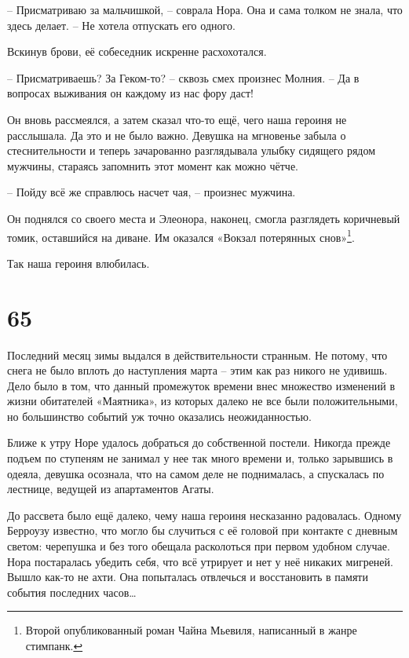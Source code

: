 \documentclass[
  a5paperpaper,
  DIV=11,
  numbers=noendperiod]{scrreprt}
\begin{document}
-- Присматриваю за мальчишкой, -- соврала Нора. Она и сама толком не
знала, что здесь делает. -- Не хотела отпускать его одного.

Вскинув брови, её собеседник искренне расхохотался.

-- Присматриваешь? За Геком-то? -- сквозь смех произнес Молния. -- Да в
вопросах выживания он каждому из нас фору даст!

Он вновь рассмеялся, а затем сказал что-то ещё, чего наша героиня не
расслышала. Да это и не было важно. Девушка на мгновенье забыла о
стеснительности и теперь зачарованно разглядывала улыбку сидящего рядом
мужчины, стараясь запомнить этот момент как можно чётче.

-- Пойду всё же справлюсь насчет чая, -- произнес мужчина.

Он поднялся со своего места и Элеонора, наконец, смогла разглядеть
коричневый томик, оставшийся на диване. Им оказался «Вокзал потерянных
снов»\footnote{Второй опубликованный роман Чайна Мьевиля, написанный в
  жанре стимпанк.}.

Так наша героиня влюбилась.

\section*{65}\label{65}


Последний месяц зимы выдался в действительности странным. Не потому, что
снега не было вплоть до наступления марта -- этим как раз никого не
удивишь. Дело было в том, что данный промежуток времени внес множество
изменений в жизни обитателей «Маятника», из которых далеко не все были
положительными, но большинство событий уж точно оказались
неожиданностью.

Ближе к утру Норе удалось добраться до собственной постели. Никогда
прежде подъем по ступеням не занимал у нее так много времени и, только
зарывшись в одеяла, девушка осознала, что на самом деле не поднималась,
а спускалась по лестнице, ведущей из апартаментов Агаты.

До рассвета было ещё далеко, чему наша героиня несказанно радовалась.
Одному Берроузу известно, что могло бы случиться с её головой при
контакте с дневным светом: черепушка и без того обещала расколоться при
первом удобном случае. Нора постаралась убедить себя, что всё утрирует и
нет у неё никаких мигреней. Вышло как-то не ахти. Она попыталась
отвлечься и восстановить в памяти события последних часов\ldots{}
\end{document}
